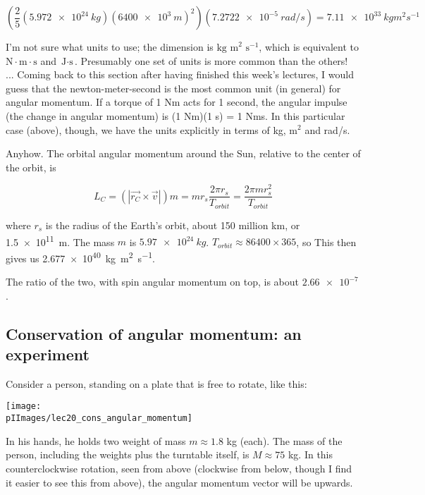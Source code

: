 \begin{equation}
\left(\frac{2}{5} (\SI{5.972e24}{kg}) (\SI{6400e3}{m})^2\right) (\SI{7.2722e-5}{rad/s}) = \SI{7.11e33}{kg m^2 s^{-1}}
\end{equation}

I'm not sure what units to use; the dimension is $\text{kg m}^2 \text{ s}^{-1}$, which is equivalent to $\text{N}\cdot\text{m} \cdot \text{s}$ and $\text{J} \cdot \text{s}$. Presumably one set of units is more common than the others!\\
... Coming back to this section after having finished this week's lectures, I would guess that the newton-meter-second is the most common unit (in general) for angular momentum. If a torque of 1 Nm acts for 1 second, the angular impulse (the change in angular momentum) is (1 Nm)(1 s) = 1 Nms. In this particular case (above), though, we have the units explicitly in terms of kg, $\text{m}^2$ and rad/s.

Anyhow.
The orbital angular momentum around the Sun, relative to the center of the orbit, is

\begin{equation}
L_C = (|\vec{r_C} \times \vec{v}|) m = m r_s \frac{2 \pi r_s}{T_{orbit}} = \frac{2 \pi m r_s^2}{T_{orbit}}
\end{equation}

where $r_s$ is the radius of the Earth's orbit, about 150 million km, or \SI{1.5e11}{m}. The mass $m$ is $\SI{5.97e24}{kg}$. $T_{orbit} \approx 86400 \times 365$, so
This then gives us \SI{2.677e40}{kg m^2 s^{-1}}.

The ratio of the two, with spin angular momentum on top, is about $\num{2.66e-7}$.

\subsection{Conservation of angular momentum: an experiment}

Consider a person, standing on a plate that is free to rotate, like this:

\begin{center}
\texttt{[image: \\pIImages/lec20\_cons\_angular\_momentum]}
\end{center}

In his hands, he holds two weight of mass $m \approx 1.8$ kg (each). The mass of the person, including the weights plus the turntable itself, is $M \approx 75$ kg.
In this counterclockwise rotation, seen from above (clockwise from below, though I find it easier to see this from above), the angular momentum vector will be upwards.

